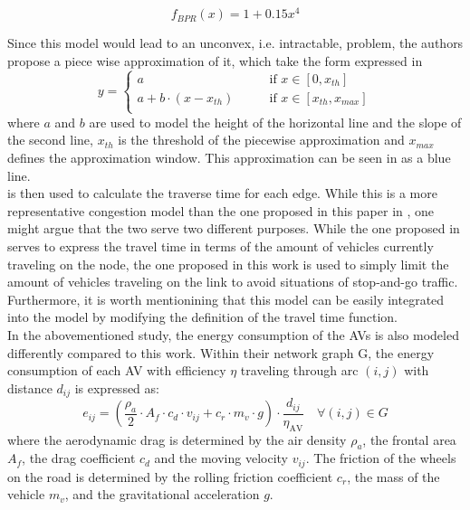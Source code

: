 \begin{equation}
	f_{BPR}(x) = 1 + 0.15x^4 
	\label{eq:bpr_model}
\end{equation}

Since this model would lead to an unconvex, i.e. intractable, problem, the authors propose a piece wise approximation of it, which take the form expressed in 
\begin{equation}
	y = \begin{cases}
		a \quad\quad &\text{if } x\in[0,x_{th}]\\ 
		a + b\cdot(x - x_{th}) \quad\quad &\text{if }x\in[x_{th}, x_{max}]\\ 
	\end{cases}
	\label{eq:model_bpr_approximation}
\end{equation}
where $a$ and $b$ are used to model the height of the horizontal line and the slope of the second line, $x_{th}$ is the threshold of the piecewise approximation and $x_{max}$ defines the approximation window. This approximation can be seen in  as a blue line. \\
 is then used to calculate the traverse time for each edge. While this is a more representative congestion model than the one proposed in this paper in , one might argue that the two serve two different purposes. While the one proposed in \cite{Salaza2019Cong} serves to express the travel time in terms of the amount of vehicles currently traveling on the node, the one proposed in this work is used to simply limit the amount of vehicles
traveling on the link to avoid situations of stop-and-go traffic. Furthermore, it is worth mentionining that this model can be easily integrated into the model by modifying the definition of the travel time function. \\
In the abovementioned study, the energy consumption of the AVs is also modeled differently compared to this work. Within their network graph G, the energy consumption of each AV with efficiency $\eta$ traveling through arc $(i,j)$ with distance $d_{ij}$ is expressed as:
\begin{equation}
e_{ij} = (\dfrac{\rho_a}{2}\cdot A_f \cdot c_d \cdot v_{ij} + c_r \cdot m_v \cdot g)\cdot \dfrac{d_{ij}}{\eta_{\text{AV}}} \quad \forall (i,j) \in G
\end{equation}
where the aerodynamic drag is determined by the air density $\rho_a$, the frontal area $A_f$,  the drag coefficient $c_d$ and the moving velocity $v_{ij}$. The friction of the wheels on the road is determined by the rolling friction coefficient $c_r$, the mass of the vehicle $m_v$, and the gravitational acceleration $g$. \\ 
